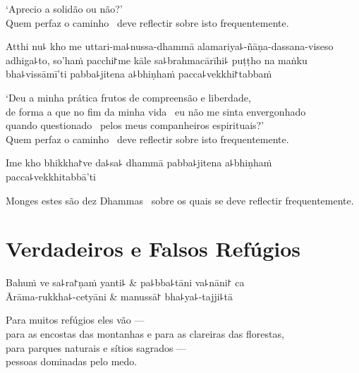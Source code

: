 \begin{english}
  `Aprecio a solidão ou não?' \pause\\
  Quem perfaz o caminho \pause\ deve reflectir sobre isto frequentemente.
\end{english}

Atthi nu꜕ kho me uttari-ma꜕nussa-dhammā alamariya꜕-ñāṇa-dassana-viseso adhiga꜕to, so'haṁ pacchi꜓me kāle sa꜕brahmacārīhi꜕ puṭṭho na maṅku bha꜕vissāmī'ti pabba꜕jitena a꜕bhiṇhaṁ pacca꜕vekkhi꜓tabbaṁ

\begin{english}
  `Deu a minha prática frutos de compreensão e liberdade, \pause\\ de forma a que
  no fim da minha vida \pause\ eu não me sinta envergonhado \pause\\
  quando questionado \pause\ pelos meus companheiros espirituais?' \pause\\
  Quem perfaz o caminho \pause\ deve reflectir sobre isto frequentemente.
\end{english}

Ime kho bhikkha꜓ve da꜕sa꜕ dhammā pabba꜕jitena a꜕bhiṇhaṁ pacca꜕vekkhitabbā'ti

\begin{english}
  Monges estes são dez Dhammas \pause\ sobre os quais se deve reflectir frequentemente.
\end{english}

\chapter{Verdadeiros e Falsos Refúgios}


\begin{leader}
\end{leader}

\begin{twochants}
  Bahuṁ ve sa꜕ra꜓ṇaṁ yanti꜕ & pa꜕bba꜕tāni va꜕nāni꜓ ca \\
  Ārāma-rukkha꜕-cetyāni & manussā꜓ bha꜕ya꜕-tajji꜕tā \\
\end{twochants}

\begin{english}
  Para muitos refúgios eles vão ---\\
  para as encostas das montanhas e para as clareiras das florestas,\\
  para parques naturais e sítios sagrados ---\\
  pessoas dominadas pelo medo.
\end{english}

